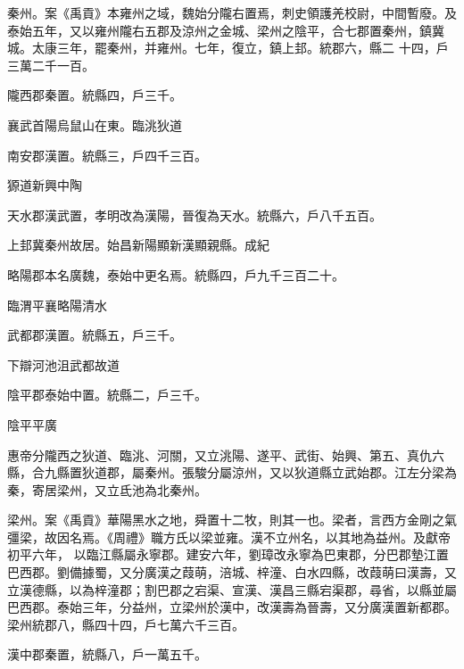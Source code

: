 \begin{pinyinscope}
 秦州。案《禹貢》本雍州之域，魏始分隴右置焉，刺史領護羌校尉，中間暫廢。及泰始五年，又以雍州隴右五郡及涼州之金城、梁州之陰平，合七郡置秦州，鎮冀城。太康三年，罷秦州，并雍州。七年，復立，鎮上邽。統郡六，縣二
 十四，戶三萬二千一百。



 隴西郡秦置。統縣四，戶三千。



 襄武首陽烏鼠山在東。臨洮狄道



 南安郡漢置。統縣三，戶四千三百。



 獂道新興中陶



 天水郡漢武置，孝明改為漢陽，晉復為天水。統縣六，戶八千五百。



 上邽冀秦州故居。始昌新陽顯新漢顯親縣。成紀



 略陽郡本名廣魏，泰始中更名焉。統縣四，戶九千三百二十。



 臨渭平襄略陽清水



 武都郡漢置。統縣五，戶三千。



 下辯河池沮武都故道



 陰平郡泰始中置。統縣二，戶三千。



 陰平平廣



 惠帝分隴西之狄道、臨洮、河關，又立洮陽、遂平、武街、始興、第五、真仇六縣，合九縣置狄道郡，屬秦州。張駿分屬涼州，又以狄道縣立武始郡。江左分梁為秦，寄居梁州，又立氐池為北秦州。



 梁州。案《禹貢》華陽黑水之地，舜置十二牧，則其一也。梁者，言西方金剛之氣彊梁，故因名焉。《周禮》職方氏以梁並雍。漢不立州名，以其地為益州。及獻帝初平六年，
 以臨江縣屬永寧郡。建安六年，劉璋改永寧為巴東郡，分巴郡墊江置巴西郡。劉備據蜀，又分廣漢之葭萌，涪城、梓潼、白水四縣，改葭萌曰漢壽，又立漢德縣，以為梓潼郡；割巴郡之宕渠、宣漢、漢昌三縣宕渠郡，尋省，以縣並屬巴西郡。泰始三年，分益州，立梁州於漢中，改漢壽為晉壽，又分廣漢置新都郡。梁州統郡八，縣四十四，戶七萬六千三百。



 漢中郡秦置，統縣八，戶一萬五千。




\end{pinyinscope}
